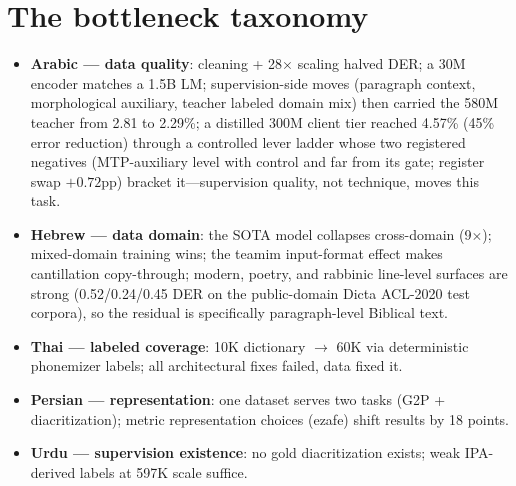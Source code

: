 \documentclass[11pt]{article}
\begin{document}
\section{The bottleneck taxonomy}
\begin{itemize}
  \item \textbf{Arabic --- data quality}: cleaning + 28$\times$ scaling
        halved DER; a 30M encoder matches a 1.5B LM; supervision-side
        moves (paragraph context, morphological auxiliary, teacher
        labeled domain mix) then carried the 580M teacher from 2.81 to
        2.29\%; a distilled 300M client tier reached 4.57\% (45\%
        error reduction) through a controlled lever ladder whose two
        registered negatives (MTP-auxiliary level with control and far
        from its gate; register swap $+0.72$pp) bracket it---supervision quality, not technique,
        moves this task.
  \item \textbf{Hebrew --- data domain}: the SOTA model collapses
        cross-domain (9$\times$); mixed-domain training wins; the teamim
        input-format effect makes cantillation copy-through; modern,
        poetry, and rabbinic line-level surfaces are strong
        (0.52/0.24/0.45 DER on the public-domain Dicta ACL-2020 test
        corpora), so the residual is specifically paragraph-level
        Biblical text.
  \item \textbf{Thai --- labeled coverage}: 10K dictionary $\to$ 60K
        via deterministic phonemizer labels; all architectural fixes
        failed, data fixed it.
  \item \textbf{Persian --- representation}: one dataset serves two
        tasks (G2P + diacritization); metric representation choices
        (ezafe) shift results by 18 points.
  \item \textbf{Urdu --- supervision existence}: no gold diacritization
        exists; weak IPA-derived labels at 597K scale suffice.
\end{itemize}
\end{document}
